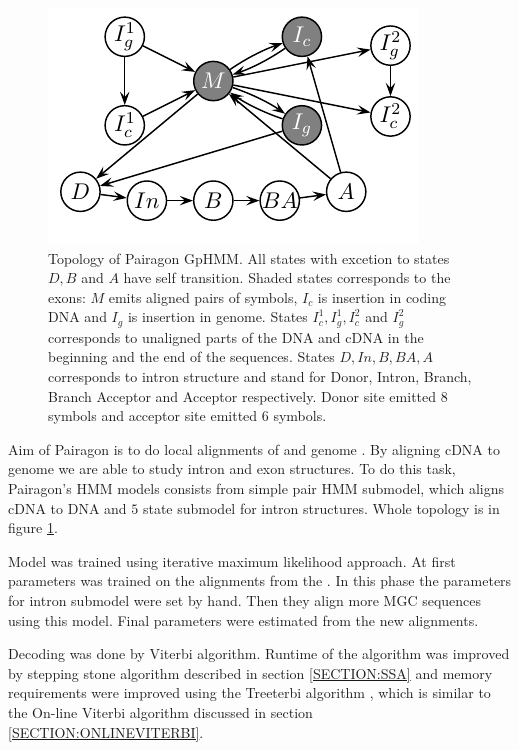 \begin{figure}
\begin{center}
\includegraphics{../figures/pairagon.pdf}
\end{center}
\caption[Topology of Pairagon generalized pair hidden Markov model.]{
Topology of Pairagon GpHMM. All states with excetion to states
$D,B$ and $A$ have self transition.
Shaded states corresponds to the exons: $M$ emits
aligned pairs of symbols, $I_c$ is insertion in coding DNA and $I_g$ is
insertion in genome. States $I^1_c,I^1_g,I^2_c$ and $I^2_g$ corresponds to
unaligned parts of the DNA and cDNA in the beginning and the end of the
sequences. States $D,In,B,BA,A$ corresponds to intron structure and stand for 
Donor, Intron, Branch, Branch Acceptor and Acceptor respectively.
Donor site emitted $8$ symbols and acceptor site emitted $6$ symbols.
}\label{FIGURE:PAIRAGON}
\end{figure}


Aim of Pairagon is to do local alignments of  and
genome \cite{Pairagon2009}. By aligning cDNA to genome we are able to study
intron and exon structures.  To do this task, Pairagon's HMM models consists
from simple pair HMM submodel, which aligns cDNA to DNA and $5$ state submodel
for intron structures.  Whole topology is in figure \ref{FIGURE:PAIRAGON}. 

Model was trained using iterative maximum likelihood approach. At first
parameters was trained on the alignments from the . In this phase the parameters for intron submodel were set by
hand. Then they align more MGC sequences using this model. Final parameters were
estimated from the new alignments.

Decoding was done by Viterbi algorithm. Runtime of the algorithm was improved by
stepping stone algorithm described in section \ref{SECTION:SSA} and memory
requirements were improved using the Treeterbi algorithm \cite{Keibler2007},
which is similar to the On-line Viterbi algorithm discussed in section
\ref{SECTION:ONLINEVITERBI}.


